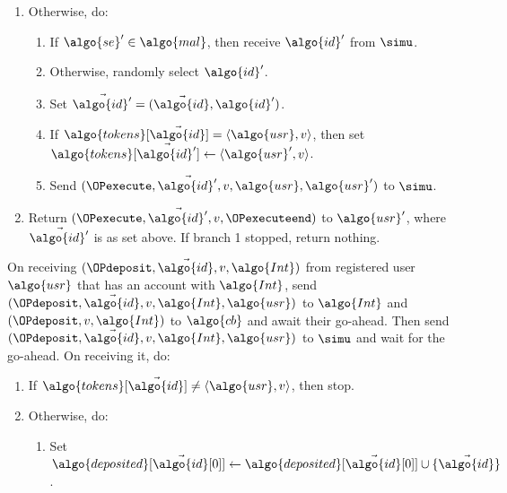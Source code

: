 \begin{framed}
\begin{enumerate}
	  \item Otherwise, do:

	    \begin{enumerate}

	      \item If $\algo{se}' \in \algo{mal}$, then receive $\algo{id}'$ from
$\simu$.

	      \item Otherwise, randomly select $\algo{id}'$.

	      \item Set $\vec{\algo{id}'} = (\vec{\algo{id}}, \algo{id}')$.

	      \item If $\algo{tokens}[\vec{\algo{id}}] = \langle \algo{usr}, v
\rangle$, then set $\algo{tokens}[\vec{\algo{id}'}] \leftarrow \langle \algo{usr}', v
\rangle$.

	      \item Send $(\OPexecute,\vec{\algo{id}'}, v, \algo{usr}, \algo{usr}')$
to $\simu$.

	    \end{enumerate}

	  \item Return $(\OPexecute, \vec{\algo{id}'}, v, \OPexecuteend)$ to
$\algo{usr}'$, where $\vec{\algo{id}'}$ is as set above. If branch 1 stopped, return
nothing.

	\end{enumerate}

	\fuinterface{\OPdeposit} On receiving $(\OPdeposit, \vec{\algo{id}}, v, \algo{Int})$
from registered user $\algo{usr}$ that has an account with $\algo{Int}$, send
$(\OPdeposit, \vec{\algo{id}}, v, \algo{Int}, \algo{usr})$ to $\algo{Int}$ and
$(\OPdeposit, v, \algo{Int})$ to $\algo{cb}$ and await their go-ahead. Then send
$(\OPdeposit, \vec{\algo{id}}, v, \algo{Int}, \algo{usr})$ to $\simu$ and wait for
the go-ahead. On receiving it, do:

	\begin{enumerate}

	  \item If $\algo{tokens}[\vec{\algo{id}}] \neq \langle \algo{usr}, v
\rangle$, then stop.

	  \item Otherwise, do:

	    \begin{enumerate}

	      \item Set $\algo{deposited}[\vec{\algo{id}}[0]] \gets
\algo{deposited}[\vec{\algo{id}}[0]] \cup \{\vec{\algo{id}}\}$.


\end{enumerate}
\end{enumerate}
\end{framed}

